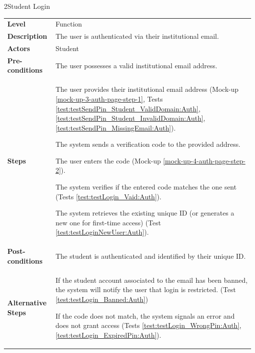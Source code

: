 \begin{usecasetable}{2}{Student Login}
	\begin{tabularx}{\textwidth}{@{} l|X @{}}
		\textbf{Level} & Function  \\
		\textbf{Description} & The user is authenticated via their institutional email. \\
		\textbf{Actors} & Student \\
		\textbf{Pre-conditions} & The user possesses a valid institutional email address. \\
		\textbf{Steps} &
		\begin{tabenum}
			\item The user provides their institutional email address (Mock-up \ref{mock-up-3-auth-page-step-1}, Tests \ref{test:testSendPin_Student_ValidDomain:Auth}, \ref{test:testSendPin_Student_InvalidDomain:Auth}, \ref{test:testSendPin_MissingEmail:Auth}).
			\item The system sends a verification code to the provided address.
			\item The user enters the code (Mock-up \ref{mock-up-4-auth-page-step-2}).
			\item The system verifies if the entered code matches the one sent (Tests \ref{test:testLogin_Vaid:Auth}).
			\item The system retrieves the existing unique ID (or generates a new one for first-time access) (Test \ref{test:testLoginNewUser:Auth}).
		\end{tabenum} \\
		\textbf{Post-conditions} & The student is authenticated and identified by their unique ID. \\
		\textbf{Alternative Steps} & \begin{tabitem}
			\item[2a.] If the student account associated to the email has been banned, the system will notify the user that login is restricted. (Test \ref{test:testLogin_Banned:Auth})
			\item[4a.] If the code does not match, the system signals an error and does not grant access (Tests \ref{test:testLogin_WrongPin:Auth}, \ref{test:testLogin_ExpiredPin:Auth}).
		\end{tabitem}
	\end{tabularx}
\end{usecasetable}


